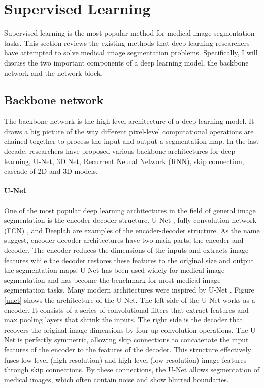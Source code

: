 \documentclass [11pt, proquest] {uwthesis}[2020/02/24]
\begin{document}
\section{Supervised Learning}

Supervised learning is the most popular method for medical image segmentation tasks. 
This section reviews the existing methods that deep learning researchers have attempted 
to solve medical image segmentation problems. Specifically, I will discuss the two 
important components of a deep learning model, the backbone network and the network block.

\subsection{Backbone network}

The backbone network is the high-level architecture of a deep learning model. 
It draws a big picture of the way different pixel-level computational operations 
are chained together to process the input and output a segmentation map. In the 
last decade, researchers have proposed various backbone architectures for deep 
learning, U-Net, 3D Net, Recurrent Neural Network (RNN), skip connection, cascade 
of 2D and 3D models.

\paragraph{U-Net}

One of the most popular deep learning architectures in the field of general image 
segmentation is the encoder-decoder structure. U-Net \cite{ navab_u-net_2015}, 
fully convolution network (FCN) \cite{long_fully_nodate}, and Deeplab \cite{chen_rethinking_2017} 
are examples of the encoder-decoder structure. As the name suggest, encoder-decoder 
architectures have two main parts, the encoder and decoder. The encoder reduces the 
dimensions of the inputs and extracts image features while the decoder restores these 
features to the original size and output the segmentation maps. U-Net has been used 
widely for medical image segmentation and has become the benchmark for most medical 
image segmentation tasks\cite{}. Many modern architectures were inspired by U-Net 
\cite{wang_non-local_2020, zhou_unet_2020, jha_doubleu-net_2020, alom_recurrent_nodate}. 
Figure \ref{unet} shows the architecture of the U-Net. The left side of the U-Net works 
as a encoder. It consists of a series of convolutional filters that extract features 
and max pooling layers that shrink the inputs. The right side is the decoder that 
recovers the original image dimensions by four up-convolution operations. The U-Net 
is perfectly symmetric, allowing skip connections to concatenate the input features 
of the encoder to the features of the decoder. This structure effectively fuses 
low-level (high resolution) and high-level (low resolution) image features through 
skip connections. By these connections, the U-Net allows segmentation of medical 
images, which often contain noise and show blurred boundaries.
\end{document}

